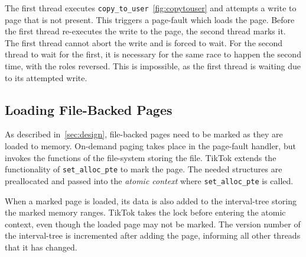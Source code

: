 \documentclass[conference]{IEEEtran}
\newcommand{\sysname}{TikTok}
\begin{document}
The first thread executes \texttt{copy\_to\_user}~\autoref{fig:copytouser} and
attempts a write to page that is not present. This triggers a page-fault which
loads the page. Before the first thread re-executes the write to the page, the
second thread marks it. The first thread cannot abort the write and is forced to
wait. For the second thread to wait for the first, it is necessary for the same
race to happen the second time, with the roles reversed. This is impossible,
as the first thread is waiting due to its attempted write.


\subsection{Loading File-Backed Pages}

As described in~\autoref{sec:design}, file-backed pages need to be marked as
they are loaded to memory. On-demand paging takes place in the page-fault
handler, but invokes the functions of the file-system storing the file. \sysname{}
extends the functionality of \texttt{set\_alloc\_pte} to mark the page. The
needed structures are preallocated and passed into the \emph{atomic context} where 
\texttt{set\_alloc\_pte} is called.

When a marked page is loaded, its data is also added to the interval-tree
storing the marked memory ranges. \sysname{} takes the lock before entering the
atomic context, even though the loaded page may not be marked. The version
number of the interval-tree is incremented after adding the page, informing all
other threads that it has changed.
\end{document}
